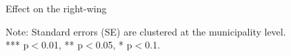 \documentclass[aspectratio=169]{beamer}
\begin{document}
\begin{frame}[label=right]{Effect on the right-wing}


\begin{center}
\begin{table}[h!]
\footnotesize
    \caption{Effect of refugee camp exposure on right-wing votes}
     \resizebox{0.5\textwidth}{!}{}
    \begin{minipage}{\textwidth}  %
    \scriptsize
    \centering
    \item Note: Standard errors (SE) are clustered at the municipality level. \\ *** p$<$0.01, ** p$<$0.05, * p$<$0.1.
    \end{minipage}
\end{table}
\end{center}

\hyperlink{left}{}









\end{frame}
\end{document}
